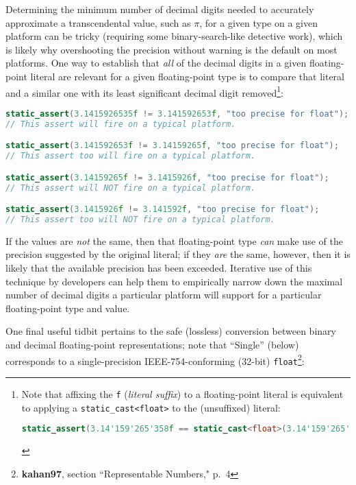Determining the minimum number of decimal digits needed to accurately
approximate a transcendental value, such as $\pi$, for a given type on
a given platform can be tricky (requiring some binary-search-like
detective work), which is likely why overshooting the precision without
warning is the default on most platforms. One way to establish that
\emph{all} of the decimal digits in a given floating-point literal are
relevant for a given floating-point type is to compare that literal and
a similar one with its least significant decimal digit
removed{\cprotect\footnote{Note that affixing the \texttt{f}
(\emph{literal suffix}) to a floating-point literal is
equivalent to applying a \texttt{static\_cast<float>} to the
(unsuffixed) literal:

\begin{lstlisting}[language=C++, basicstyle={\ttfamily\footnotesize}]
static_assert(3.14'159'265'358f == static_cast<float>(3.14'159'265'358));
\end{lstlisting}\vspace*{-1ex}
}}:

\begin{lstlisting}[language=C++]
static_assert(3.1415926535f != 3.141592653f, "too precise for float");
// This assert will fire on a typical platform.

static_assert(3.141592653f != 3.14159265f, "too precise for float");
// This assert too will fire on a typical platform.

static_assert(3.14159265f != 3.1415926f, "too precise for float");
// This assert will NOT fire on a typical platform.

static_assert(3.1415926f != 3.141592f, "too precise for float");
// This assert too will NOT fire on a typical platform.
\end{lstlisting}

\noindent If the values are \emph{not} the same, then that floating-point type
\emph{can} make use of the precision suggested by the original literal; if
they \emph{are} the same, however, then it is likely that the available
precision has been exceeded. Iterative use of this technique by
developers can help them to empirically narrow down the maximal number
of decimal digits a particular platform will support for a particular
floating-point type and value.

One final useful tidbit pertains to the safe (lossless) conversion
between binary and decimal floating-point representations; note that
``Single'' (below) corresponds to a single-precision IEEE-754-conforming
(32-bit) \texttt{float}{\cprotect\footnote{\textbf{kahan97}, section ``Representable Numbers," p.~4}}:

